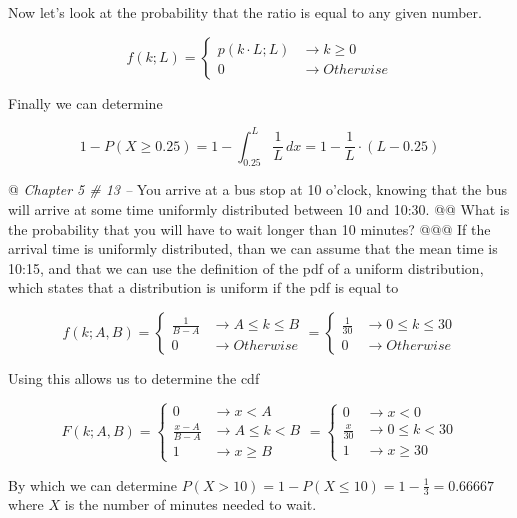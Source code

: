 \documentclass[10pt]{article}
\begin{document}
\begin{easylist}[enumerate]
    Now let's look at the probability that the ratio is equal to any given number.

    \[
        f(k; L) =
        \begin{cases}
            p(k \cdot L; L) &\to k \ge 0\\
            0 &\to Otherwise
        \end{cases}
    \]

    Finally we can determine

    \[
        1 - P(X \ge 0.25) = 1 - \int_{0.25}^L \frac{1}{L} \, dx = \boxed{1 - \frac{1}{L} \cdot (L - 0.25)}
    \]

    @ \textit{Chapter 5 \# 13 --} You arrive at a bus stop at 10 o'clock, knowing that the bus will arrive at some time
    uniformly distributed between 10 and 10:30.
    @@ What is the probability that you will have to wait longer than 10 minutes?
    @@@ If the arrival time is uniformly distributed, than we can assume that the mean time is 10:15, and that we can
    use the definition of the pdf of a uniform distribution, which states that a distribution is uniform if the pdf is
    equal to

    \[
        f(k; A, B) =
        \begin{cases}
            \frac{1}{B-A} &\to A \le k \le B\\
            0 &\to Otherwise
        \end{cases} =
        \begin{cases}
            \frac{1}{30} &\to 0 \le k \le 30\\
            0 &\to Otherwise
        \end{cases}
    \]

    Using this allows us to determine the cdf

    \[
        F(k; A, B) =
        \begin{cases}
            0 &\to x < A\\
            \frac{x-A}{B-A} &\to A \le k < B\\
            1 &\to x \ge B
        \end{cases} =
        \begin{cases}
            0 &\to x < 0\\
            \frac{x}{30} &\to 0 \le k < 30\\
            1 &\to x \ge 30
        \end{cases}
    \]

    By which we can determine $P(X > 10) = 1 - P(X \le 10) = 1 - \frac{1}{3} = \boxed{0.66667}$ where $X$ is the number
    of minutes needed to wait.


\end{easylist}
\end{document}

